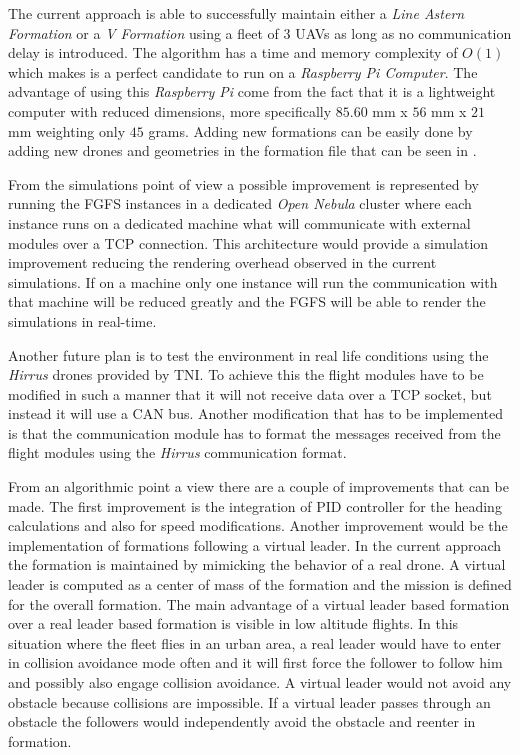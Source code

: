 The current approach is able to successfully maintain either a \textit{Line
Astern Formation} or a \textit{V Formation} using a fleet of 3 UAVs as long
as no communication delay is introduced. The algorithm has a time and memory
complexity of $O(1)$ which makes is a perfect candidate to run on a \textit{Raspberry
Pi Computer}. The advantage of using this \textit{Raspberry Pi} come from the
fact that it is a lightweight computer with reduced dimensions,  more specifically
$85.60$ mm x $56$ mm x $21$ mm weighting only $45$ grams. Adding new formations
can be easily done by adding new drones and geometries in the formation file
that can be seen in .

From the simulations point of view a possible improvement is represented by running
the FGFS instances in a dedicated \textit{Open Nebula} cluster  where each instance
runs on a dedicated machine what will communicate with external modules over 
a TCP connection. This architecture would provide a simulation improvement 
reducing the rendering overhead observed in the current simulations. If on 
a machine only one instance will run the communication with that machine will
be reduced greatly and the FGFS will be able to render the simulations in 
real-time.

Another future plan is to test the environment in real life conditions
using the \textit{Hirrus} drones provided by TNI. To achieve this the 
flight modules have to be modified in such a manner that it will not receive
data over a TCP socket, but instead it will use a CAN bus. Another modification
that has to be implemented is that the communication module has to format the 
messages received from the flight modules using the \textit{Hirrus} communication
format.

From an algorithmic point a view there are a couple of improvements that can 
be made. The first improvement is the integration of PID
controller for the heading calculations and also for speed modifications. Another
improvement would be the implementation of formations following a virtual leader.
In the current approach the formation is maintained by mimicking the behavior of 
a real drone. A virtual leader is computed as a center of mass of the formation
and the mission is defined for the overall formation. The main advantage of a
virtual leader based formation over a real leader based formation is visible 
in low altitude flights. In this situation where the fleet flies in an urban 
area,  a real leader would have to enter in collision avoidance mode often
and it will first force the follower to follow him and possibly also
engage collision avoidance. A virtual leader would not avoid any obstacle
because collisions are impossible. If a virtual leader passes through an obstacle
the followers would independently avoid the obstacle and reenter in formation. 
